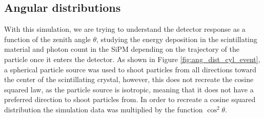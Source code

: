 


\subsection{Angular distributions}\label{sec:cos_squared}

With this simulation, we are trying to understand the detector response as a function of the zenith angle $\theta$, studying the energy deposition in the scintillating material and photon count in the SiPM depending on the trajectory of the particle once it enters the detector. As shown in Figure \ref{fig:ang_dist_cyl_event}, a spherical particle source was used to shoot particles from all directions toward the center of the scintillating crystal, however, this does not recreate the cosine squared law, as the particle source is isotropic, meaning that it does not have a preferred direction to shoot particles from. In order to recreate a cosine squared distribution the simulation data was multiplied by the function $\cos^2\theta$.

